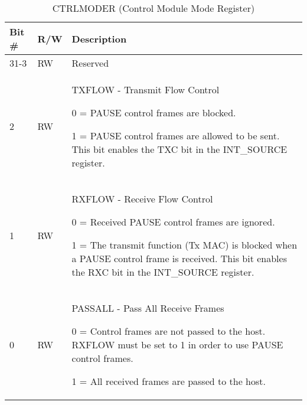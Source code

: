 \begin{table}[H]
  \centering
  \begin{tabularx}{\textwidth}{|l|l|X|}
    
    \hline
    \rowcolor{iob-green}
    {\bf Bit \#} & {\bf R/W} & {\bf Description} \\ \hline

    31-3   & RW  & Reserved \\ \hline
    \rowcolor{iob-blue}
    2  & RW  & TXFLOW - Transmit Flow Control

                0 = PAUSE control frames are blocked. 

                1 = PAUSE control frames are allowed to be sent. This bit
                enables the TXC bit in the INT\_SOURCE register.\\ \hline
    1  & RW  & RXFLOW - Receive Flow Control

                0 = Received PAUSE control frames are ignored.

                1 = The transmit function (Tx MAC) is blocked when a PAUSE
                control frame is received. This bit enables the RXC bit in the
                INT\_SOURCE register.\\ \hline
    \rowcolor{iob-blue}
    0  & RW  & PASSALL - Pass All Receive Frames

                0 = Control frames are not passed to the host. RXFLOW must be
                set to 1 in order to use PAUSE control frames.

                1 = All received frames are passed to the host.\\ \hline
  \end{tabularx}
    \caption{CTRLMODER (Control Module Mode Register)}
  \label{swreg_details:ctrlmoder}
\end{table}

